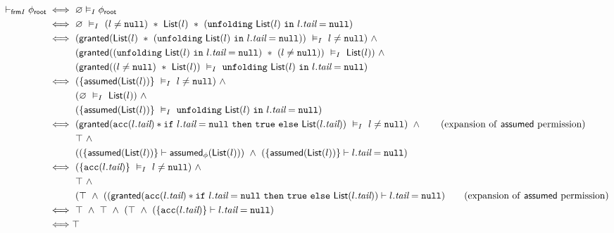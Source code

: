 \begin{align*}
\selfframing \phiroot
\iff & \
\empty \frames \phiroot
\\ \iff & \
\empty \ \frames \
(l \neq \cnull) \ \ast \
\List(l) \ \ast \
(\cunfolding \ \List(l) \ \cin \ l.\vtail = \cnull)
\\ \iff & \
  ( \granted( \List(l) \ \ast \ (\cunfolding \ \List(l) \ \cin \ l.\vtail = \cnull) ) \ \frames \
    l \neq \cnull )
  \ \land \\ & \
  ( \granted( (\cunfolding \ \List(l) \ \cin \ l.\vtail = \cnull) \ \ast \ (l \neq \cnull)) \ \frames \
    \List(l) )
  \ \land \\ & \
  (\granted( (l \neq \cnull) \ \ast \ \List(l) ) \ \frames \
    \cunfolding \ \List(l) \ \cin \ l.\vtail = \cnull )
\\ \iff & \
  ( \set{ \assumed(\List(l)) } \ \frames \ l \neq \cnull ) \ \land \\ & \
  ( \empty \ \frames \ \List(l) ) \ \land \\ & \
  ( \set{ \assumed(\List(l)) } \ \frames \ \cunfolding \ \List(l) \ \cin \ l.\vtail = \cnull )
\\ \iff & \
  ( \granted( \cacc(l.\vtail) \ast \cif \ l.\vtail = \cnull \ \cthen \ \ctrue \ \celse \ \List(l.\vtail) ) \ \frames \ l \neq \cnull ) \ \land \tag{expansion of \assumed \ permission} \\ & \
  \top \ \land \\ & \
  ( ( \set{ \assumed(\List(l)) } \entails \assumed_\phi(\List(l)) ) \ \land \
    ( \set{ \assumed(\List(l)) } \entails l.\vtail = \cnull )
\\ \iff & \
  ( \set{ \cacc(l.\vtail) } \ \frames \ l \neq \cnull ) \ \land \\ & \
  \top \ \land \\ & \
  ( \top \ \land \
    ( ( \granted( \cacc(l.\vtail) \ast \cif \ l.\vtail = \cnull \ \cthen \ \ctrue \ \celse \ \List(l.\vtail) ) \entails l.\vtail = \cnull )
    \tag{expansion of \assumed \ permission}
\\ \iff & \
  \top \ \land \
  \top \ \land \
  ( \top \ \land \
    ( \set{ \cacc(l.\vtail) } \entails l.\vtail = \cnull )
\\ \iff &
  \top
\end{align*}

